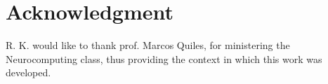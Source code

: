 \documentclass[conference]{IEEEtran}
\begin{document}
\section*{Acknowledgment}

R. K. would like to thank prof. Marcos Quiles, for ministering the Neurocomputing class, thus providing the context in which this work was developed.




\vspace{12pt}
\color{red}
\end{document}
